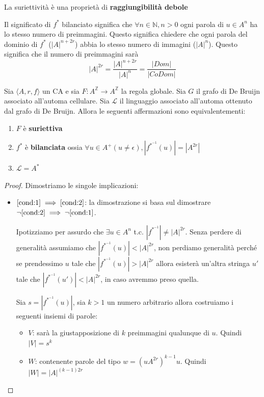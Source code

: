 La suriettività è una proprietà di \textbf{raggiungibilità debole}

\begin{nota}
    Il significato di $f^{\ast}$ bilanciato significa che $\forall n\in \mathbb{N}, n>0$
    ogni parola di $u\in A^n$ ha lo stesso numero di preimmagini. Questo significa
    chiedere che ogni parola del dominio di $f^{\ast}$ ($|A|^{n+2r}$) abbia lo stesso 
    numero di immagini ($|A|^n$). Questo significa che il numero di preimmagini
    sarà
    \begin{equation*}
        |A|^{2r} = \frac{|A|^{n+2r}}{|A|^n} = \frac{|Dom|}{|CoDom|}
    \end{equation*}
\end{nota}

\begin{teorema}
    \label{th:suriettività_CA}
    Sia $\langle A,r,f\rangle$ un CA e sia $F: A^\mathbb{Z}\rightarrow A^\mathbb{Z}$
    la regola globale. Sia $G$ il grafo di De Bruijn associato all'automa cellulare.
    Sia $\mathcal{L}$ il linguaggio associato all'automa ottenuto dal grafo di De Bruijn.
    Allora le seguenti affermazioni sono equivalentementi:
    \begin{enumerate}
        \item \label{cond:1}$F$ è \textbf{suriettiva}
        \item \label{cond:2}$f^\ast$ è \textbf{bilanciata} ossia $\forall u \in A^+ (u\ne \epsilon), |f^{\ast^{-1}}(u)|= |A^{2r}|$
        \item \label{cond:3}$\mathcal{L} = A^\ast$
    \end{enumerate}
    \begin{proof}
        Dimostriamo le singole implicazioni:
        \begin{itemize}
            \item $\ref{cond:1}\implies \ref{cond:2}$: la dimostrazione si basa 
            sul dimostrare $\lnot \ref{cond:2}\implies \lnot \ref{cond:1}$.

            Ipotizziamo per assurdo che $\exists u\in A^n$ t.c. $|f^{\ast^{-1}}|\ne |A|^{2r}$.
            Senza perdere di generalità assumiamo che $|f^{\ast^{-1}}(u)|< |A|^{2r}$,
            non perdiamo generalità perché se prendessimo $u$ tale che $|f^{\ast^{-1}}(u)|> |A|^{2r}$
            allora esisterà un'altra stringa $u'$ tale che $|f^{\ast^{-1}}(u')|< |A|^{2r}$,
            in caso avremmo preso quella.

            Sia $s = |f^{\ast^{-1}}(u)|$, sia $k>1$ un numero arbitrario allora costruiamo
            i seguenti insiemi di parole:
            \begin{itemize}
                \item $V$: sarà la giustapposizione di $k$ preimmagini qualunque 
                di $u$. Quindi $|V| = s^k$
                \item $W$: contenente parole del tipo $w=(uA^{2r})^{k-1}u$. Quindi $|W| = |A|^{(k-1)2r}$
            \end{itemize}


\end{itemize}
\end{proof}
\end{teorema}
